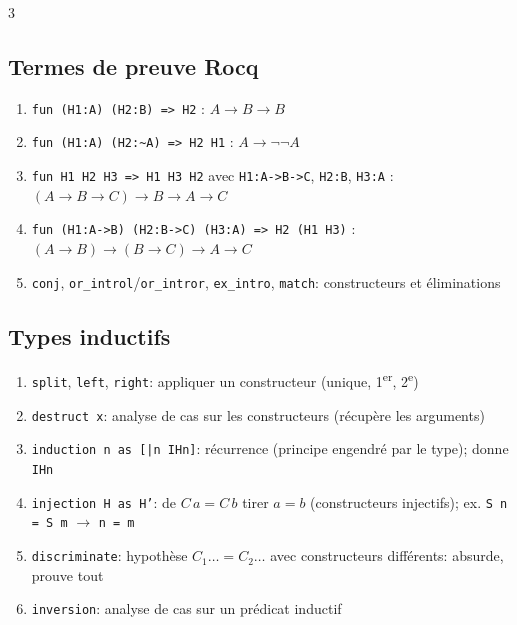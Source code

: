\documentclass[12pt, a4paper]{article}
\begin{document}
\begin{multicols*}{3}
	\subsection{Termes de preuve Rocq}
	\begin{enumerate}[\roman*.]
		\item \texttt{fun (H1:A) (H2:B) => H2} : $A\to B\to B$
		\item \texttt{fun (H1:A) (H2:\~{}A) => H2 H1} : $A\to\neg\neg A$
		\item \texttt{fun H1 H2 H3 => H1 H3 H2} avec \texttt{H1:A->B->C}, \texttt{H2:B}, \texttt{H3:A} : $(A\to B\to C)\to B\to A\to C$
		\item \texttt{fun (H1:A->B) (H2:B->C) (H3:A) => H2 (H1 H3)} : $(A\to B)\to(B\to C)\to A\to C$
		\item \texttt{conj}, \texttt{or\_introl}/\texttt{or\_intror}, \texttt{ex\_intro}, \texttt{match}: constructeurs et éliminations
	\end{enumerate}

	\colbreak
	\subsection{Types inductifs}
	\begin{enumerate}[\roman*.]
		\item \texttt{split}, \texttt{left}, \texttt{right}: appliquer un constructeur (unique, 1\textsuperscript{er}, 2\textsuperscript{e})
		\item \texttt{destruct x}: analyse de cas sur les constructeurs (récupère les arguments)
		\item \texttt{induction n as [|n IHn]}: récurrence (principe engendré par le type); donne \texttt{IHn}
		\item \texttt{injection H as H'}: de $C\,a=C\,b$ tirer $a=b$ (constructeurs injectifs); ex. \texttt{S n = S m} $\to$ \texttt{n = m}
		\item \texttt{discriminate}: hypothèse $C_1\ldots=C_2\ldots$ avec constructeurs différents: absurde, prouve tout
		\item \texttt{inversion}: analyse de cas sur un prédicat inductif
	\end{enumerate}


\end{multicols*}
\end{document}
